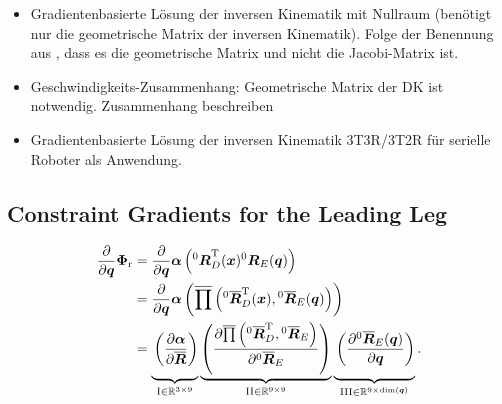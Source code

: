 \documentclass[robotics,article,submit,moreauthors,pdftex]{Definitions/mdpi}
\newcommand{\bm}[1]{\boldsymbol{#1}}
\newcommand{\rotmat}[2]{{{ }^{#1}\boldsymbol{R}}_{#2}}
\newcommand{\rotmato}[2]{{{ }^{#1}\boldsymbol{\overline{R}}}_{#2}}
\newcommand{\transp}[0]{{\mathrm{T}}}
\begin{document}
\begin{itemize}
    \item Gradientenbasierte Lösung der inversen Kinematik mit Nullraum (benötigt nur die geometrische Matrix der inversen Kinematik). Folge der Benennung aus \cite{Gogu2008}, dass es die geometrische Matrix und nicht die Jacobi-Matrix ist.
    \item Geschwindigkeits-Zusammenhang: Geometrische Matrix der DK ist notwendig. Zusammenhang beschreiben
    \item Gradientenbasierte Lösung der inversen Kinematik 3T3R/3T2R für serielle Roboter als Anwendung.
\end{itemize}

\subsection{Constraint Gradients for the Leading Leg}

\begin{align}
\frac{\partial}{\partial \bm{q}}\bm{\Phi}_{\mathrm{r}}
&=
\frac{\partial}{\partial \bm{q}} \bm{\alpha}\left(\rotmat{0}{D}^\transp(\bm{x}) \rotmat{0}{E}(\bm{q})\right) \label{equ:grad_Phi_q}\\
&=
\frac{\partial}{\partial \bm{q}} \bm{\alpha}\left(\overline{\prod}\left( \rotmato{0}{D}^\transp(\bm{x}), \rotmato{0}{E}(\bm{q})\right)\right) \nonumber \\
&=
\underbrace{\vphantom{\left(\frac{\partial \overline{\prod}\left(\rotmato{0}{D}^\transp, \rotmato{0}{E}\right)}{\partial \rotmato{0}{E}}\right)}\left(\frac{\partial \bm{\alpha}}{\partial \overline{\bm{R}}}\right)}_{\mathrm{I} \in {\mathbb{R}}^{3 \times 9}}
\underbrace{\left(\frac{\partial \overline{\prod}\left(\rotmato{0}{D}^\transp, \rotmato{0}{E}\right)}{\partial \rotmato{0}{E}}\right)}_{\mathrm{II} \in {\mathbb{R}}^{9 \times 9}}
\underbrace{\vphantom{\left(\frac{\partial \overline{\prod}\left(\rotmato{0}{D}^\transp, \rotmato{0}{E}\right)}{\partial \rotmato{0}{E}}\right)}\left(\frac{\partial \rotmato{0}{E}(\bm{q})}{\partial \bm{q}} \right)}_{\mathrm{III} \in {\mathbb{R}}^{9 \times \mathrm{dim}(\bm{q})}}.  \nonumber
\end{align}
\end{document}
